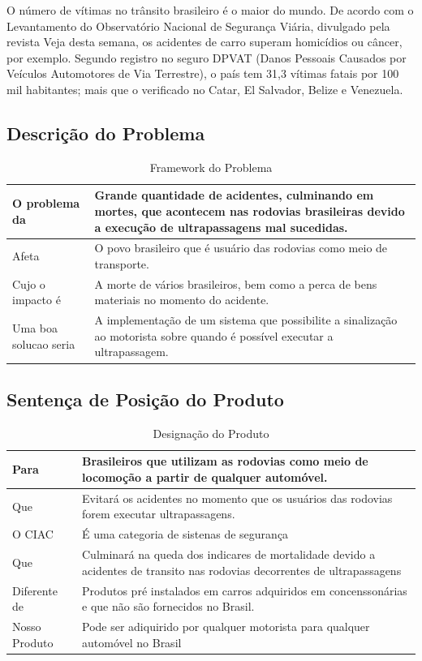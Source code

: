 O número de vítimas no trânsito brasileiro é o maior do mundo. De acordo com o Levantamento do Observatório
 Nacional de Segurança Viária, divulgado pela revista Veja desta semana, os acidentes de carro superam
 homicídios ou câncer, por exemplo. Segundo registro no seguro DPVAT (Danos Pessoais Causados por Veículos
  Automotores de Via Terrestre), o país tem 31,3 vítimas fatais por 100 mil habitantes; mais que o
  verificado no Catar, El Salvador, Belize e Venezuela.\cite{brasilTemMaisVitimasDeTransito}


\subsection{Descrição do Problema}
\begin{table}[ht]
\caption{Framework do Problema}
\centering
\begin{tabular}{| l |  p{7cm} |}
\hline
O problema da & Grande quantidade de acidentes, culminando em mortes, que acontecem nas
rodovias brasileiras devido a execução de ultrapassagens mal sucedidas.\\
\hline
Afeta & O povo brasileiro que é usuário das rodovias como meio de transporte. \\
\hline
Cujo o impacto é & A morte de vários brasileiros, bem como a perca de bens materiais no momento do acidente.\\
\hline
Uma boa solucao seria & A implementação de um sistema que possibilite a sinalização ao
motorista sobre quando é possível executar a ultrapassagem. \\
\hline
\end{tabular}
\end{table}


\subsection{Sentença de Posição do Produto}

\begin{table}[ht]
\caption{Designação do Produto}
\centering
\begin{tabular}{| l |  p{7cm} |}
\hline
Para & Brasileiros que utilizam as rodovias como meio de locomoção a partir de qualquer automóvel. \\
\hline
Que & Evitará os acidentes no momento que os usuários das rodovias forem executar ultrapassagens. \\
\hline
O CIAC & É uma categoria de sistenas de segurança\\
\hline
Que & Culminará na queda dos indicares de mortalidade devido a acidentes de transito nas rodovias decorrentes de ultrapassagens \\
\hline
Diferente de & Produtos pré instalados em carros adquiridos em concenssonárias e que não são fornecidos no Brasil.  \\
\hline
Nosso Produto & Pode ser adiquirido por qualquer motorista para qualquer automóvel no Brasil\\
\hline
\end{tabular}
\end{table}

